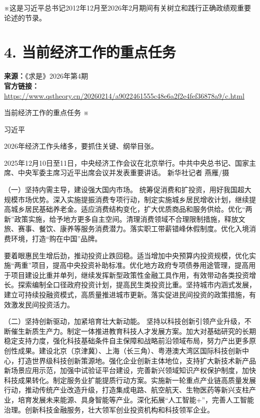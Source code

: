 \documentclass[UTF8,zihao=-4]{ctexart}
\begin{document}
※这是习近平总书记2012年12月至2026年2月期间有关树立和践行正确政绩观重要论述的节录。

\clearpage
\section*{4. 当前经济工作的重点任务}
\noindent\textbf{来源：}《求是》2026年第4期\\
\noindent\textbf{官方链接：}
\noindent\url{https://www.qstheory.cn/20260214/a9022461555c48e6a2f2e4fef36878a9/c.html}

当前经济工作的重点任务 ※

习近平

2026年经济工作头绪多，要抓住关键、纲举目张。

2025年12月10日至11日，中央经济工作会议在北京举行。中共中央总书记、国家主席、中央军委主席习近平出席会议并发表重要讲话。 新华社记者 燕雁/摄

（一）坚持内需主导，建设强大国内市场。 统筹促消费和扩投资，用好我国超大规模市场优势。深入实施提振消费专项行动，制定实施城乡居民增收计划，继续提高城乡居民基础养老金。适应消费结构变化，扩大优质商品和服务供给。优化“两新”政策实施，给予地方更多自主空间。清理消费领域不合理限制措施，释放文旅、赛事、餐饮、康养等服务消费潜力。落实职工带薪错峰休假制度。优化入境消费环境，打造“购在中国”品牌。

要着眼惠民生增后劲，推动投资止跌回稳。适当增加中央预算内投资规模，优化实施“两重”项目，提高中央投资补助标准。优化地方政府专项债券用途管理，提高用于项目建设比重并单列，继续发挥新型政策性金融工具作用，有效带动各类投资增长。探索编制全口径政府投资计划，提高民生类投资比重。坚持城市内涵式发展，建立可持续投融资模式，高质量推进城市更新。落实促进民间投资的政策措施，有效激发民间投资活力。

（二）坚持创新驱动，加紧培育壮大新动能。 坚持以科技创新引领产业升级，不断催生新质生产力。制定一体推进教育科技人才发展方案。加大对基础研究的长期稳定支持力度，强化科技基础条件自主保障和战略前沿领域布局，努力产出更多原创性成果。建设北京（京津冀）、上海（长三角）、粤港澳大湾区国际科技创新中心，打造世界级科技创新策源地。强化企业创新主体地位，支持扩大新技术新产品新场景应用示范，加强中试验证平台建设，完善新兴领域知识产权保护制度，加快科技成果转化。制定服务业扩能提质行动方案。实施新一轮重点产业链高质量发展行动，推动传统产业改造升级，打造集成电路、航空航天、生物医药等新兴支柱产业，培育发展未来能源、具身智能等产业。深化拓展“人工智能+”，完善人工智能治理。创新科技金融服务，壮大领军创业投资机构和科技领军企业。
\end{document}
